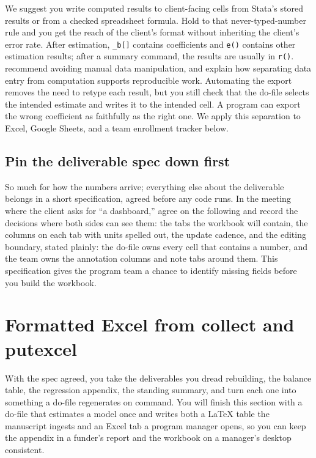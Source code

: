 We suggest you write computed results to client-facing cells from Stata's stored results or from a checked spreadsheet formula. Hold to that never-typed-number rule and you get the reach of the client's format without inheriting the client's error rate. After estimation, \texttt{\_b[]} contains coefficients and \texttt{e()} contains other estimation results; after a summary command, the results are usually in \texttt{r()}. \textcite{sandve2013reproducible} recommend avoiding manual data manipulation, and \textcite{broman2018spreadsheets} explain how separating data entry from computation supports reproducible work. Automating the export removes the need to retype each result, but you still check that the do-file selects the intended estimate and writes it to the intended cell. A program can export the wrong coefficient as faithfully as the right one. We apply this separation to Excel, Google Sheets, and a team enrollment tracker below.

\subsection{Pin the deliverable spec down first}\label{sec:ch11-spec}
So much for how the numbers arrive; everything else about the deliverable belongs in a short specification, agreed before any code runs. In the meeting where the client asks for \enquote{a dashboard,} agree on the following and record the decisions where both sides can see them: the tabs the workbook will contain, the columns on each tab with units spelled out, the update cadence, and the editing boundary, stated plainly: the do-file owns every cell that contains a number, and the team owns the annotation columns and note tabs around them. This specification gives the program team a chance to identify missing fields before you build the workbook.

\section{Formatted Excel from collect and putexcel}
With the spec agreed, you take the deliverables you dread rebuilding, the balance table, the regression appendix, the standing summary, and turn each one into something a do-file regenerates on command. You will finish this section with a do-file that estimates a model once and writes both a \LaTeX{} table the manuscript ingests and an Excel tab a program manager opens, so you can keep the appendix in a funder's report and the workbook on a manager's desktop consistent.


